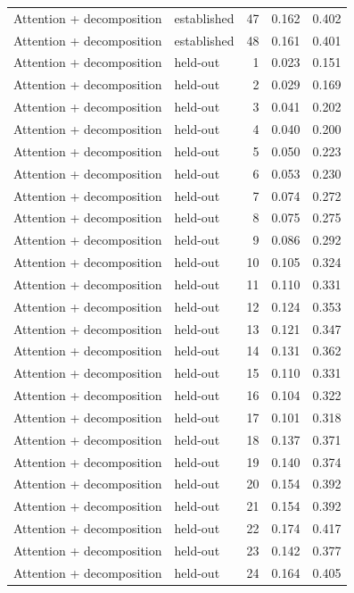 \begin{tabular}{llrrr}
Attention + decomposition & established & 47 & 0.162 & 0.402 \\
Attention + decomposition & established & 48 & 0.161 & 0.401 \\
Attention + decomposition & held-out & 1 & 0.023 & 0.151 \\
Attention + decomposition & held-out & 2 & 0.029 & 0.169 \\
Attention + decomposition & held-out & 3 & 0.041 & 0.202 \\
Attention + decomposition & held-out & 4 & 0.040 & 0.200 \\
Attention + decomposition & held-out & 5 & 0.050 & 0.223 \\
Attention + decomposition & held-out & 6 & 0.053 & 0.230 \\
Attention + decomposition & held-out & 7 & 0.074 & 0.272 \\
Attention + decomposition & held-out & 8 & 0.075 & 0.275 \\
Attention + decomposition & held-out & 9 & 0.086 & 0.292 \\
Attention + decomposition & held-out & 10 & 0.105 & 0.324 \\
Attention + decomposition & held-out & 11 & 0.110 & 0.331 \\
Attention + decomposition & held-out & 12 & 0.124 & 0.353 \\
Attention + decomposition & held-out & 13 & 0.121 & 0.347 \\
Attention + decomposition & held-out & 14 & 0.131 & 0.362 \\
Attention + decomposition & held-out & 15 & 0.110 & 0.331 \\
Attention + decomposition & held-out & 16 & 0.104 & 0.322 \\
Attention + decomposition & held-out & 17 & 0.101 & 0.318 \\
Attention + decomposition & held-out & 18 & 0.137 & 0.371 \\
Attention + decomposition & held-out & 19 & 0.140 & 0.374 \\
Attention + decomposition & held-out & 20 & 0.154 & 0.392 \\
Attention + decomposition & held-out & 21 & 0.154 & 0.392 \\
Attention + decomposition & held-out & 22 & 0.174 & 0.417 \\
Attention + decomposition & held-out & 23 & 0.142 & 0.377 \\
Attention + decomposition & held-out & 24 & 0.164 & 0.405 \\

\end{tabular}
